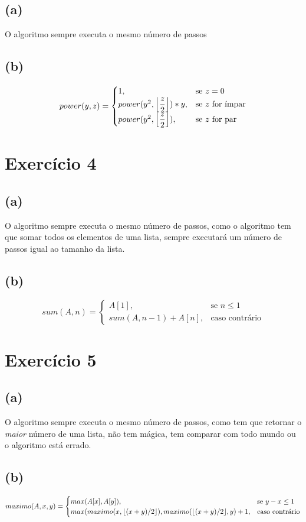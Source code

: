 \documentclass{article}
\DeclarePairedDelimiter\floor{\lfloor}{\rfloor}
\begin{document}
\subsection*{(a)}
O algoritmo sempre executa o mesmo número de passos
\subsection*{(b)}
\begin{equation}
    power(y,z)=\begin{cases}
    1, & \text{se }z = 0\\
    power(y^2, \floor*{\dfrac{z}{2}})*y, & \text{se $z$ for ímpar}\\
    power(y^2, \floor*{\dfrac{z}{2}}), & \text{se $z$ for par}
\end{cases}
\end{equation}

\section{Exercício 4}
\subsection*{(a)}
O algoritmo sempre executa o mesmo número de passos, como o algoritmo tem que somar
todos os elementos de uma lista, sempre executará um número de passos igual ao
tamanho da lista.
\subsection*{(b)}
\begin{equation}
    sum(A,n)=\begin{cases}
    A[1], & \text{se $n \leq 1$}\\
    sum(A, n-1)+ A[n], &\text{caso contrário}
\end{cases}
\end{equation}

\section{Exercício 5}

\subsection*{(a)}
O algoritmo sempre executa o mesmo número de passos, como tem que retornar o
\textit{maior} número de uma lista, não tem mágica, tem comparar com todo mundo
ou o algoritmo está errado.
\subsection*{(b)}
\begin{equation}
    maximo(A,x,y)=\begin{cases}
    max(A[x],A[y]), &\text{se $y-x\leq1$}\\
    max(maximo(x,\floor*{(x+y)/2}), maximo(\floor*{(x+y)/2},y)+1, & \text{caso contrário}
\end{cases}
\end{equation}
\end{document}

